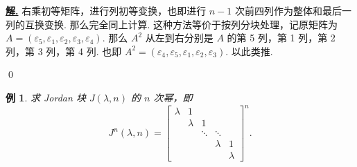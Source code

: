 \documentclass[10pt,openany]{article}
\theoremstyle{thmstyle} %
\theoremstyle{defstyle} %
\theoremstyle{prostyle} %
\theoremstyle{exastyle}
\newtheorem{example}[theorem]{例}
\theoremstyle{remstyle}
\newenvironment{solution}{\par\underline{\textbf{解.}} \;\fangsong}{\qed\par}
\begin{document}
\begin{solution}
	右乘初等矩阵，进行列初等变换，也即进行 \( n-1 \) 次前四列作为整体和最后一列的互换变换. 那么完全同上计算. 这种方法等价于按列分块处理，记原矩阵为 \( A=(\varepsilon_5,\varepsilon_1,\varepsilon_2,\varepsilon_3,\varepsilon_4) \). 那么 \( A^2 \) 从左到右分别是 \( A \) 的第 5 列，第 1 列，第 2 列，第 3 列，第 4 列. 也即 \( A^2=(\varepsilon_4,\varepsilon_5,\varepsilon_1,\varepsilon_2,\varepsilon_3) \). 以此类推. 
	
	\vspace{2ex}
	
\end{solution}


\begin{example}
	求 Jordan 块 \( J(\lambda,n) \) 的 \( n \) 次幂，即
	\[ J^n(\lambda,n)=\begin{bmatrix}
		\lambda & 1 &  & & \\
		& \lambda & 1 & & \\
		& & \ddots & \ddots & \\
		& & & \lambda &1 \\
		& & & & \lambda
	\end{bmatrix}^n. \]
\end{example}
\end{document}
